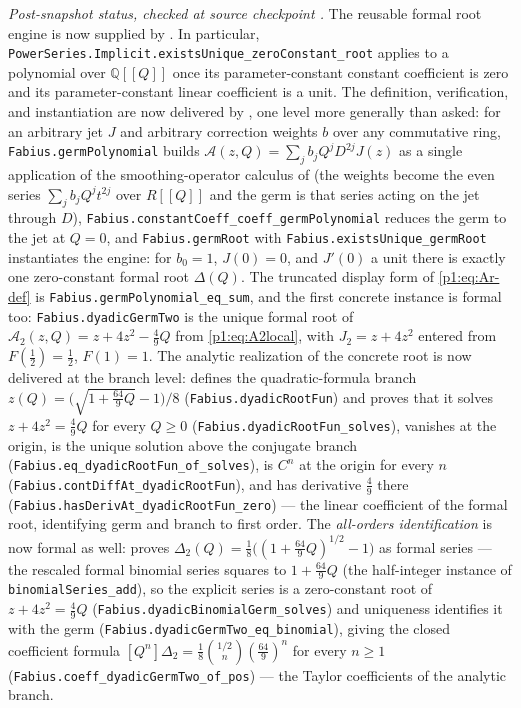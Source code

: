 \documentclass[11pt,oneside]{article}
\numberwithin{equation}{section}
\theoremstyle{definition}
\theoremstyle{remark}
\newcommand{\Q}{\mathbb Q}
\begin{document}
\begin{obligation}
\emph{Post-snapshot status, checked at source checkpoint
.}
The reusable formal root engine is now supplied by
.  In particular,
\nolinkurl{PowerSeries.Implicit.existsUnique_zeroConstant_root} applies to a
polynomial over $\Q[[Q]]$ once its parameter-constant
constant coefficient is zero and its parameter-constant linear coefficient is
a unit.  The definition, verification, and instantiation are now
delivered by , one level more generally than asked:
for an arbitrary jet $J$ and arbitrary correction weights $b$ over any commutative
ring, \nolinkurl{Fabius.germPolynomial} builds $\mathcal A(z,Q)=\sum_j b_jQ^jD^{2j}J(z)$
as a single application of the smoothing-operator calculus of
 (the weights become the even series
$\sum_j b_jQ^jt^{2j}$ over $R[[Q]]$ and the germ is that series acting on the jet
through $D$), \nolinkurl{Fabius.constantCoeff_coeff_germPolynomial} reduces the germ to
the jet at $Q=0$, and \nolinkurl{Fabius.germRoot} with \nolinkurl{Fabius.existsUnique_germRoot}
instantiates the engine: for $b_0=1$, $J(0)=0$, and $J'(0)$ a unit there is exactly
one zero-constant formal root $\Delta(Q)$.  The truncated display form of
\eqref{p1:eq:Ar-def} is \nolinkurl{Fabius.germPolynomial\_eq\_sum}, and the first concrete
instance is formal too: \nolinkurl{Fabius.dyadicGermTwo} is the unique formal root of
$\mathcal A_2(z,Q)=z+4z^2-\tfrac49Q$ from \eqref{p1:eq:A2local}, with $J_2=z+4z^2$ entered
from $F(\tfrac12)=\tfrac12$, $F(1)=1$.  The analytic realization of the concrete
root is now delivered at the branch level: 
defines the quadratic-formula branch \(z(Q)=\bigl(\sqrt{1+\tfrac{64}{9}Q}-1\bigr)/8\)
(\nolinkurl{Fabius.dyadicRootFun}) and proves that it solves $z+4z^2=\tfrac49Q$ for every
$Q\ge0$ (\nolinkurl{Fabius.dyadicRootFun\_solves}), vanishes at the origin, is the unique
solution above the conjugate branch (\nolinkurl{Fabius.eq\_dyadicRootFun\_of\_solves}),
is $C^n$ at the origin for every $n$ (\nolinkurl{Fabius.contDiffAt\_dyadicRootFun}), and
has derivative $\tfrac49$ there (\nolinkurl{Fabius.hasDerivAt\_dyadicRootFun\_zero}) --- the
linear coefficient of the formal root, identifying germ and branch to first order.
The \emph{all-orders identification} is now formal as well: 
proves $\Delta_2(Q)=\tfrac18\bigl((1+\tfrac{64}{9}Q)^{1/2}-1\bigr)$ as formal series ---
the rescaled formal binomial series squares to $1+\tfrac{64}{9}Q$ (the half-integer
instance of \nolinkurl{binomialSeries\_add}), so the explicit series is a zero-constant
root of $z+4z^2=\tfrac49Q$ (\nolinkurl{Fabius.dyadicBinomialGerm\_solves}) and uniqueness
identifies it with the germ (\nolinkurl{Fabius.dyadicGermTwo\_eq\_binomial}), giving the
closed coefficient formula $[Q^n]\Delta_2=\tfrac18\binom{1/2}{n}(\tfrac{64}{9})^n$ for every $n\ge1$
(\nolinkurl{Fabius.coeff\_dyadicGermTwo\_of\_pos}) --- the Taylor coefficients of the
analytic branch.


\end{obligation}
\end{document}
